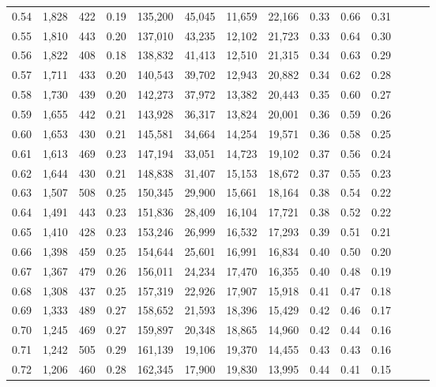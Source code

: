 \begin{tabular}{rrrrrrrrrrrrrr}
0.54 &  1,828 &    422 &  0.19 &  135,200 &   45,045 &  11,659 &  22,166 &  0.33 &  0.66 &      0.31 \\
0.55 &  1,810 &    443 &  0.20 &  137,010 &   43,235 &  12,102 &  21,723 &  0.33 &  0.64 &      0.30 \\
0.56 &  1,822 &    408 &  0.18 &  138,832 &   41,413 &  12,510 &  21,315 &  0.34 &  0.63 &      0.29 \\
0.57 &  1,711 &    433 &  0.20 &  140,543 &   39,702 &  12,943 &  20,882 &  0.34 &  0.62 &      0.28 \\
0.58 &  1,730 &    439 &  0.20 &  142,273 &   37,972 &  13,382 &  20,443 &  0.35 &  0.60 &      0.27 \\
0.59 &  1,655 &    442 &  0.21 &  143,928 &   36,317 &  13,824 &  20,001 &  0.36 &  0.59 &      0.26 \\
0.60 &  1,653 &    430 &  0.21 &  145,581 &   34,664 &  14,254 &  19,571 &  0.36 &  0.58 &      0.25 \\
0.61 &  1,613 &    469 &  0.23 &  147,194 &   33,051 &  14,723 &  19,102 &  0.37 &  0.56 &      0.24 \\
0.62 &  1,644 &    430 &  0.21 &  148,838 &   31,407 &  15,153 &  18,672 &  0.37 &  0.55 &      0.23 \\
0.63 &  1,507 &    508 &  0.25 &  150,345 &   29,900 &  15,661 &  18,164 &  0.38 &  0.54 &      0.22 \\
0.64 &  1,491 &    443 &  0.23 &  151,836 &   28,409 &  16,104 &  17,721 &  0.38 &  0.52 &      0.22 \\
0.65 &  1,410 &    428 &  0.23 &  153,246 &   26,999 &  16,532 &  17,293 &  0.39 &  0.51 &      0.21 \\
0.66 &  1,398 &    459 &  0.25 &  154,644 &   25,601 &  16,991 &  16,834 &  0.40 &  0.50 &      0.20 \\
0.67 &  1,367 &    479 &  0.26 &  156,011 &   24,234 &  17,470 &  16,355 &  0.40 &  0.48 &      0.19 \\
0.68 &  1,308 &    437 &  0.25 &  157,319 &   22,926 &  17,907 &  15,918 &  0.41 &  0.47 &      0.18 \\
0.69 &  1,333 &    489 &  0.27 &  158,652 &   21,593 &  18,396 &  15,429 &  0.42 &  0.46 &      0.17 \\
0.70 &  1,245 &    469 &  0.27 &  159,897 &   20,348 &  18,865 &  14,960 &  0.42 &  0.44 &      0.16 \\
0.71 &  1,242 &    505 &  0.29 &  161,139 &   19,106 &  19,370 &  14,455 &  0.43 &  0.43 &      0.16 \\
0.72 &  1,206 &    460 &  0.28 &  162,345 &   17,900 &  19,830 &  13,995 &  0.44 &  0.41 &      0.15 \\

\end{tabular}
